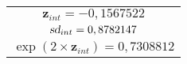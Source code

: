 \documentclass[landscape,a0paper,fontscale=0.285]{baposter} %
\begin{document}
\begin{poster}
{\begin{center}
\begin{tabular}{c}
$\mathbf{z}_{int}=-0,1567522$\\
$\textsl{sd}_{int}=0,8782147$\\
$\exp(2\times\mathbf{z}_{int})=0,7308812$\\
\end{tabular}
\end{center}










}
\end{poster}
\end{document}
